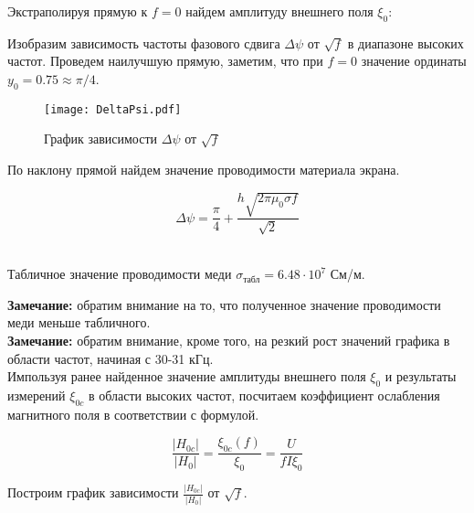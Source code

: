     Экстраполируя прямую к $f = 0$ найдем амплитуду внешнего поля $\xi_0$:

    \begin{center}
    \end{center}

    Изобразим зависимость частоты фазового сдвига $\Delta \psi$ от $\sqrt{f}$ в диапазоне высоких частот.
    Проведем наилучшую прямую, заметим, что при $f = 0$ значение ординаты $y_0 = 0.75 \approx \pi/4$.

    \begin{figure}
        \centering
        \texttt{[image: DeltaPsi.pdf]}
        \caption{График зависимости $\Delta \psi$ от $\sqrt{f}$}
        \label{DeltaPsi}
    \end{figure}

    По наклону прямой найдем значение проводимости материала экрана.

    \begin{equation}
        \Delta \psi = \frac{\pi}{4} + \frac{h \sqrt{2 \pi \mu_0 \sigma f}}{\sqrt{2}}
    \end{equation}

    \begin{center}
         \\
        Табличное значение проводимости меди $\sigma_{\text{табл}} = 6.48 \cdot 10^7$ См/м.
    \end{center}

    \textbf{Замечание:} обратим внимание на то, что полученное значение проводимости меди меньше табличного. %
    \\

    \textbf{Замечание:} обратим внимание, кроме того, на резкий рост значений графика в области частот, начиная с 30-31 кГц. %
    \\

    Импользуя ранее найденное значение амплитуды внешнего поля $\xi_0$ и результаты измерений $\xi_{0c}$
    в области высоких частот, посчитаем коэффициент ослабления магнитного поля в соответствии с формулой.

    \begin{equation}
        \frac{|H_{0c}|}{|H_{0}|} = \frac{\xi_{0c}(f)}{\xi_0} = \frac{U}{f I \xi_0}
    \end{equation}

    Построим график зависимости $\frac{|H_{0c}|}{|H_{0}|}$ от $\sqrt{f}$.

